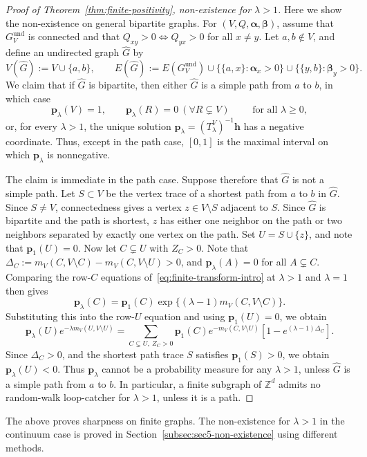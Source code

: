 \documentclass[11pt]{article}
\numberwithin{equation}{section}
\newcommand{\1}{\mathbf{1}}
\newcommand\wh[1]{\widehat{#1}}
\newcommand{\bp}{\mathbf p}
\newcommand{\bh}{\mathbf h}
\begin{document}
\begin{proof}[Proof of Theorem~\ref{thm:finite-positivity}, non-existence for \(\lambda>1\)]
\label{rmk:general-non-existence}
Here we show the non-existence on general bipartite graphs.
For $(V,Q,\boldsymbol{\alpha},\boldsymbol{\beta})$, assume that
$G_V^{\mathrm{und}}$ is connected and that
$Q_{xy}>0\Longleftrightarrow Q_{yx}>0$ for all $x\neq y$.
Let $a,b\notin V$, and define an undirected graph $\wh G$ by
\[
V(\wh G):=V\cup\{a,b\},\qquad
E(\wh G):=E(G_V^{\mathrm{und}})
\cup\bigl\{\{a,x\}: \boldsymbol{\alpha}_x>0\bigr\}
\cup\bigl\{\{y,b\}: \boldsymbol{\beta}_y>0\bigr\}.
\]
We claim that if $\wh G$ is bipartite, then either $\wh G$ is a simple path from $a$ to $b$, in which case
\[
    \bp_\lambda(V)=1,\qquad \bp_\lambda(R)=0\ (\forall R\subsetneq V)
    \qquad \text{ for all } \lambda\geq0,
\]
or, for every $\lambda>1$, the unique solution
$\bp_\lambda=(T_\lambda^V)^{-1}\bh$ has a negative coordinate.
Thus, except in the path case, $[0,1]$ is the maximal interval on which
$\bp_\lambda$ is nonnegative.

The claim is immediate in the path case. Suppose therefore that $\wh G$
is not a simple path. Let $S\subset V$ be the vertex trace of a shortest path from $a$ to $b$ in $\wh G$. Since $S\neq V$, connectedness gives a vertex $z\in V\setminus S$ adjacent to $S$. Since $\wh G$ is bipartite and the path is shortest, $z$ has either one neighbor on the path or two neighbors separated by exactly one vertex on the path. Set $U=S\cup\{z\}$, and note that $\bp_1(U)=0$. 
Now let $C\subsetneq U$ with $Z_C>0$. Note that $\Delta_C
:=m_V(C,V\setminus C)-m_V(C,V\setminus U)>0$,
and $\bp_\lambda(A)=0$ for all $A\subsetneq C$. Comparing the row-$C$
equations of~\eqref{eq:finite-transform-intro} at $\lambda>1$ and $\lambda=1$ then gives
\[
\bp_\lambda(C)
=
\bp_1(C)\exp\!\bigl\{(\lambda-1)m_V(C,V\setminus C)\bigr\}.
\]
Substituting this into the row-$U$ equation and using $\bp_1(U)=0$, we obtain
\[
\bp_\lambda(U)e^{-\lambda m_V(U,V\setminus U)}
=
\sum_{C\subsetneq U,\ Z_C>0}
\bp_1(C)e^{-m_V(C,V\setminus U)}
\left[
1-e^{(\lambda-1)\Delta_C}
\right].
\]
Since $\Delta_C>0$, and the shortest path trace $S$ satisfies
$\bp_1(S)>0$, we obtain $\bp_\lambda(U)<0$.
Thus $\bp_\lambda$ cannot be a probability measure for any $\lambda>1$,
unless $\wh G$ is a simple path from $a$ to $b$.
In particular, a finite subgraph of $\mathbb Z^d$ admits no random-walk
loop-catcher for $\lambda>1$, unless it is a path.
\end{proof}

The above proves sharpness on finite graphs.  The non-existence for \(\lambda>1\) in the continuum case is proved in
Section~\ref{subsec:sec5-non-existence} using different methods.
\end{document}
